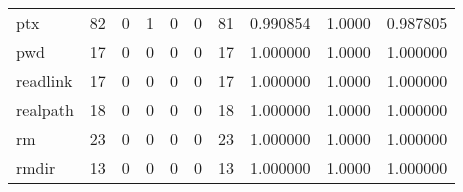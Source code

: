 \begin{longtable}{lrrrrrrrrr}
ptx       &                                       82 &                                                  0 &                                                  1 &                                                  0 &                                                  0 &                                                 81 &                                           0.990854 &                                 1.0000 &                             0.987805 \\
pwd       &                                       17 &                                                  0 &                                                  0 &                                                  0 &                                                  0 &                                                 17 &                                           1.000000 &                                 1.0000 &                             1.000000 \\
readlink  &                                       17 &                                                  0 &                                                  0 &                                                  0 &                                                  0 &                                                 17 &                                           1.000000 &                                 1.0000 &                             1.000000 \\
realpath  &                                       18 &                                                  0 &                                                  0 &                                                  0 &                                                  0 &                                                 18 &                                           1.000000 &                                 1.0000 &                             1.000000 \\
rm        &                                       23 &                                                  0 &                                                  0 &                                                  0 &                                                  0 &                                                 23 &                                           1.000000 &                                 1.0000 &                             1.000000 \\
rmdir     &                                       13 &                                                  0 &                                                  0 &                                                  0 &                                                  0 &                                                 13 &                                           1.000000 &                                 1.0000 &                             1.000000 \\

\end{longtable}
